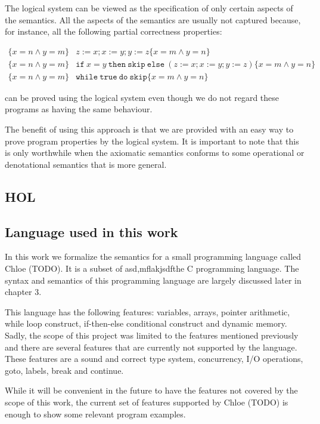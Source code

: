 The logical system can be viewed as the specification of only certain aspects of the semantics.
All the aspects of the semantics are usually not captured because, for instance, all the following partial correctness properties:

\begin{align*}
\lbrace x=n \land y=m \rbrace & z:=x; x:=y; y:=z                                                \lbrace x=m \land y=n\rbrace\\
\lbrace x=n \land y=m \rbrace & \mathtt{if }\ x = y\ \mathtt{ then}\ \mathtt{ skip }\ \mathtt{ else }\ (z:=x; x:=y; y:=z) \lbrace x=m \land y=n\rbrace\\
\lbrace x=n \land y=m \rbrace & \mathtt{while }\ \mathtt{ true }\ \mathtt{ do }\ \mathtt{ skip }                                    \lbrace x=m \land y=n\rbrace
\end{align*}

can be proved using the logical system even though we do not regard these programs as having the same behaviour.


The benefit of using this approach is that we are provided with an easy way to prove program properties by the logical system.
It is important to note that this is only worthwhile when the axiomatic semantics conforms to some operational or denotational semantics that is more general.



\subsection{HOL}

\subsection{Language used in this work}

In this work we formalize the semantics for a small programming language called Chloe (TODO).
It is a subset of asd,mflakjsdfthe C programming language.
The syntax and semantics of this programming language are largely discussed later in chapter 3.

This language has the following features: variables, arrays, pointer arithmetic, while loop construct, if-then-else conditional construct and dynamic memory.
Sadly, the scope of this project was limited to the features mentioned previously and there are several features that are currently not supported by the language.
These features are a sound and correct type system, concurrency, I/O operations, goto, labels, break and continue.

While it will be convenient in the future to have the features not covered by the scope of this work, the current set of features supported by Chloe (TODO) is enough to show some relevant program examples.

\begin{comment}
The language should probably have a name.
I have to give one to it.
Here I write what kind of features my language has.
Variables, loops, functions, pointers, etc.
And the features I do not support.
Concurrency, types, etc.
\end{comment}
